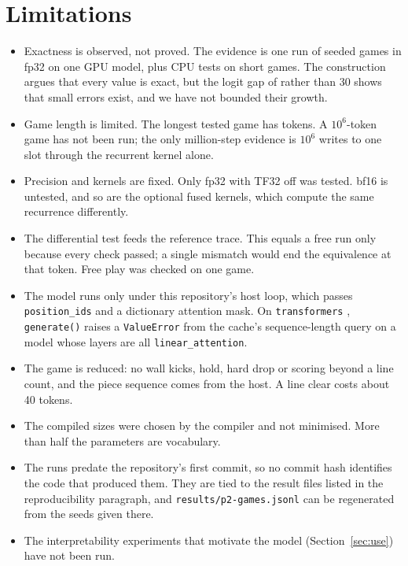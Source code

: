 \documentclass[11pt]{article}
\begin{document}
\section{Limitations}
\label{sec:limits}

\begin{itemize}
\item Exactness is observed, not proved. The evidence is one run of \nPtwoGames{} seeded games in fp32 on one GPU model, plus CPU tests on short games. The construction argues that every value is exact, but the logit gap of \nPtwoGap{} rather than 30 shows that small errors exist, and we have not bounded their growth.
\item Game length is limited. The longest tested game has \nPtwoMaxGameTokens{} tokens. A $10^6$-token game has not been run; the only million-step evidence is $10^6$ writes to one slot through the recurrent kernel alone.
\item Precision and kernels are fixed. Only fp32 with TF32 off was tested. bf16 is untested, and so are the optional fused kernels, which compute the same recurrence differently.
\item The differential test feeds the reference trace. This equals a free run only because every check passed; a single mismatch would end the equivalence at that token. Free play was checked on one game.
\item The model runs only under this repository's host loop, which passes \texttt{position\_ids} and a dictionary attention mask. On \texttt{transformers} \nTfVersion{}, \texttt{generate()} raises a \texttt{ValueError} from the cache's sequence-length query on a model whose layers are all \texttt{linear\_attention}.
\item The game is reduced: no wall kicks, hold, hard drop or scoring beyond a line count, and the piece sequence comes from the host. A line clear costs about 40 tokens.
\item The compiled sizes were chosen by the compiler and not minimised. More than half the parameters are vocabulary.
\item The runs predate the repository's first commit, so no commit hash identifies the code that produced them. They are tied to the result files listed in the reproducibility paragraph, and \texttt{results/p2-games.jsonl} can be regenerated from the seeds given there.
\item The interpretability experiments that motivate the model (Section~\ref{sec:use}) have not been run.
\end{itemize}
\end{document}
